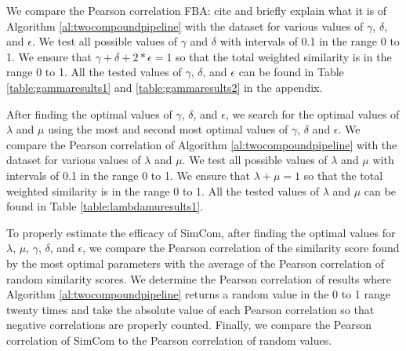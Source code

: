 \documentclass{article}
\newcommand\fba[1]{\textcolor{SeaGreen3}{FBA: #1}}
\begin{document}
We compare the Pearson correlation \fba{cite and briefly explain what it is} of Algorithm \ref{al:twocompoundpipeline} with the dataset for various values of $\gamma$, $\delta$, and $\epsilon$. We test all possible values of $\gamma$ and $\delta$ with intervals of 0.1 in the range 0 to 1. We ensure that $\gamma + \delta + 2 * \epsilon = 1$ so that the total weighted similarity is in the range 0 to 1. All the tested values of $\gamma$, $\delta$, and $\epsilon$ can be found in Table \ref{table:gammaresults1} and \ref{table:gammaresults2} in the appendix. 

After finding the optimal values of $\gamma$, $\delta$, and $\epsilon$, we search for the optimal values of $\lambda$ and $\mu$ using the most and second most optimal values of $\gamma$, $\delta$ and $\epsilon$. We   compare the Pearson correlation of Algorithm \ref{al:twocompoundpipeline} with the dataset for various values of $\lambda$ and $\mu$. We   test all possible values of $\lambda$ and $\mu$ with intervals of 0.1 in the range 0 to 1. We   ensure that $\lambda + \mu = 1$ so that the total weighted similarity is in the range 0 to 1. All the tested values of $\lambda$ and $\mu$ can be found in Table \ref{table:lambdamuresults1}.

To properly estimate the efficacy of SimCom, after finding the optimal values for $\lambda$, $\mu$, $\gamma$, $\delta$, and $\epsilon$, we   compare the Pearson correlation of the similarity score found by the most optimal parameters with the average of the Pearson correlation of random similarity scores. We   determine the Pearson correlation of results where Algorithm \ref{al:twocompoundpipeline} returns a random value in the 0 to 1 range twenty times and take the absolute value of each Pearson correlation so that negative correlations are properly counted. Finally, we   compare the Pearson correlation of SimCom to the Pearson correlation of random values.



\end{document}
